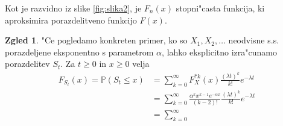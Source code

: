 \documentclass[12pt, a4paper, reqno]{amsart}
\theoremstyle{definition} %
\newtheorem{zgled}[definicija]{Zgled}
\theoremstyle{plain} %
\newcommand{\R}{\mathbb{R}}
\newcommand{\Prob}{\mathbb{P}}
\newcommand{\1}{\mathds{1}}
\begin{document}
    \noindent
    Kot je razvidno iz slike \ref{fig:slika2}, je $F_n(x)$ stopni"casta funkcija, ki aproksimira 
    porazdelitveno funkcijo $F(x)$.




%
%
%
%
%
%
%
%
    \begin{zgled}
        "Ce pogledamo konkreten primer, ko so $X_1, X_2, \dots$ neodvisne s.s. porazdeljene eksponentno 
        s parametrom $\alpha$, lahko eksplicitno izra"cunamo porazdelitev $S_t$. Za $t\geq 0$
        in $x \geq 0$ velja
        \begin{align*}
            F_{S_t}(x) = \Prob(S_t \leq x)
            &= \sum_{k=0}^\infty F_X^{*k}(x)\frac{(\lambda t)^k}{k!}e^{-\lambda t}\\
            &= \sum_{k=0}^\infty \frac{\alpha^kx^{k-1}e^{-\alpha x}}{(k-2)!}\frac{(\lambda t)^k}{k!}e^{-\lambda t}\\
            &= \sum_{k=0}^\infty
        \end{align*}
    \end{zgled}
\end{document}
